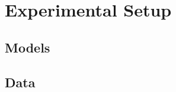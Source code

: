 \section{Experimental Setup}
\label{sec:setup}

\subsection{Models}

\subsection{Data}

\begin{table}[t]
  \centering
  \caption{Data statistics (aggregate counts from the data-preparation run; generated).}
  \label{tab:data}
  
\end{table}

